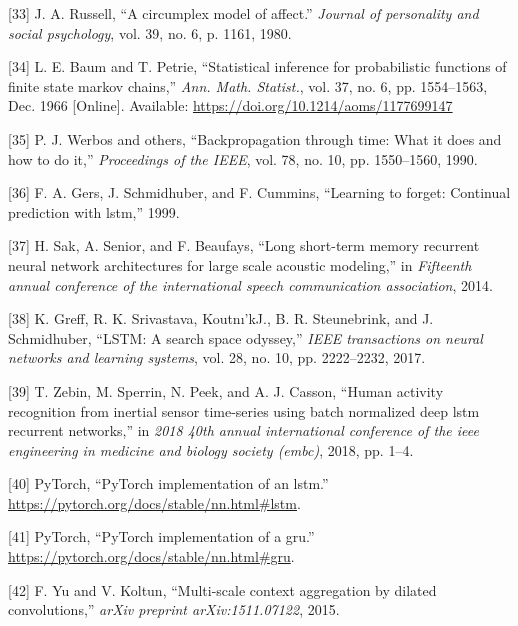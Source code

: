 \documentclass[12pt,]{article}
\begin{document}
\leavevmode\hypertarget{ref-russell1980circumplex}{}%
{[}33{]} J. A. Russell, ``A circumplex model of affect.'' \emph{Journal
of personality and social psychology}, vol. 39, no. 6, p. 1161, 1980.

\leavevmode\hypertarget{ref-baum1966}{}%
{[}34{]} L. E. Baum and T. Petrie, ``Statistical inference for
probabilistic functions of finite state markov chains,'' \emph{Ann.
Math. Statist.}, vol. 37, no. 6, pp. 1554--1563, Dec. 1966 {[}Online{]}.
Available: \url{https://doi.org/10.1214/aoms/1177699147}

\leavevmode\hypertarget{ref-werbos1990backpropagation}{}%
{[}35{]} P. J. Werbos and others, ``Backpropagation through time: What
it does and how to do it,'' \emph{Proceedings of the IEEE}, vol. 78, no.
10, pp. 1550--1560, 1990.

\leavevmode\hypertarget{ref-gers1999learning}{}%
{[}36{]} F. A. Gers, J. Schmidhuber, and F. Cummins, ``Learning to
forget: Continual prediction with lstm,'' 1999.

\leavevmode\hypertarget{ref-sak2014long}{}%
{[}37{]} H. Sak, A. Senior, and F. Beaufays, ``Long short-term memory
recurrent neural network architectures for large scale acoustic
modeling,'' in \emph{Fifteenth annual conference of the international
speech communication association}, 2014.

\leavevmode\hypertarget{ref-greff2017lstm}{}%
{[}38{]} K. Greff, R. K. Srivastava, Koutnı'kJ., B. R. Steunebrink, and
J. Schmidhuber, ``LSTM: A search space odyssey,'' \emph{IEEE
transactions on neural networks and learning systems}, vol. 28, no. 10,
pp. 2222--2232, 2017.

\leavevmode\hypertarget{ref-zebin2018human}{}%
{[}39{]} T. Zebin, M. Sperrin, N. Peek, and A. J. Casson, ``Human
activity recognition from inertial sensor time-series using batch
normalized deep lstm recurrent networks,'' in \emph{2018 40th annual
international conference of the ieee engineering in medicine and biology
society (embc)}, 2018, pp. 1--4.

\leavevmode\hypertarget{ref-pytorchlstm}{}%
{[}40{]} \relax PyTorch, ``PyTorch implementation of an lstm.'' \\
\url{https://pytorch.org/docs/stable/nn.html\#lstm}.

\leavevmode\hypertarget{ref-pytorchgru}{}%
{[}41{]} \relax PyTorch, ``PyTorch implementation of a gru.'' \\
\url{https://pytorch.org/docs/stable/nn.html\#gru}.

\leavevmode\hypertarget{ref-yu2015multi}{}%
{[}42{]} F. Yu and V. Koltun, ``Multi-scale context aggregation by
dilated convolutions,'' \emph{arXiv preprint arXiv:1511.07122}, 2015.
\end{document}
